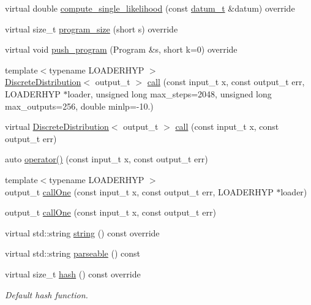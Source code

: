 \begin{DoxyCompactItemize}
virtual double \hyperlink{class_l_o_t_hypothesis_a0ff11e5e328fcfa819a8dd9b5d57bd65}{compute\+\_\+single\+\_\+likelihood} (const \hyperlink{class_l_o_t_hypothesis_ae36b1f113f45ee5ac82660028672739b}{datum\+\_\+t} \&datum) override
\item 
virtual size\+\_\+t \hyperlink{class_l_o_t_hypothesis_a9fb7caa245a82c53bcfbac846ab1b327}{program\+\_\+size} (short s) override
\item 
virtual void \hyperlink{class_l_o_t_hypothesis_a2b9a0eca1e2124f92bd34d8da929fe71}{push\+\_\+program} (Program \&s, short k=0) override
\item 
{\footnotesize template$<$typename L\+O\+A\+D\+E\+R\+H\+YP $>$ }\\\hyperlink{class_discrete_distribution}{Discrete\+Distribution}$<$ output\+\_\+t $>$ \hyperlink{class_l_o_t_hypothesis_a9f528a8b204b87cc6fcf8d81c8c2b036}{call} (const input\+\_\+t x, const output\+\_\+t err, L\+O\+A\+D\+E\+R\+H\+YP $\ast$loader, unsigned long max\+\_\+steps=2048, unsigned long max\+\_\+outputs=256, double minlp=-\/10.)
\item 
virtual \hyperlink{class_discrete_distribution}{Discrete\+Distribution}$<$ output\+\_\+t $>$ \hyperlink{class_l_o_t_hypothesis_a3e46160113b9602cff4c4765c768b57d}{call} (const input\+\_\+t x, const output\+\_\+t err)
\item 
auto \hyperlink{class_l_o_t_hypothesis_a7275626861140284ee08512fd0641ce1}{operator()} (const input\+\_\+t x, const output\+\_\+t err)
\item 
{\footnotesize template$<$typename L\+O\+A\+D\+E\+R\+H\+YP $>$ }\\output\+\_\+t \hyperlink{class_l_o_t_hypothesis_a34051e59cc251c4d6bb3caddbe594414}{call\+One} (const input\+\_\+t x, const output\+\_\+t err, L\+O\+A\+D\+E\+R\+H\+YP $\ast$loader)
\item 
output\+\_\+t \hyperlink{class_l_o_t_hypothesis_a834197767cb83a17c6b3eb564e11a3b2}{call\+One} (const input\+\_\+t x, const output\+\_\+t err)
\item 
virtual std\+::string \hyperlink{class_l_o_t_hypothesis_acda322aef217a0d358ae6cea19969904}{string} () const override
\item 
virtual std\+::string \hyperlink{class_l_o_t_hypothesis_a4037b5dea60aeb19d72c16e308886bc2}{parseable} () const
\item 
virtual size\+\_\+t \hyperlink{class_l_o_t_hypothesis_a7c33d51f8d81762b1eca7f86b596236a}{hash} () const override
\begin{DoxyCompactList}\small\item\em Default hash function. \end{DoxyCompactList}\item 

\end{DoxyCompactItemize}
